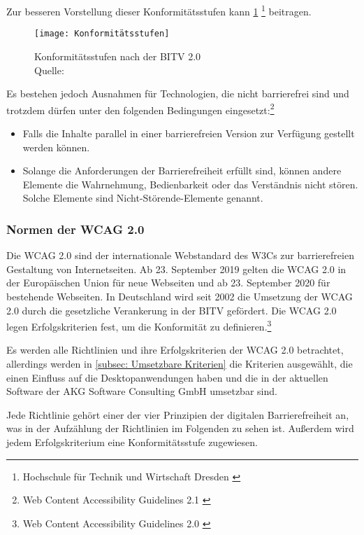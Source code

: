 Zur besseren Vorstellung dieser Konformitätsstufen kann \cref{fig:Konformitätsstufen} \footnote{Hochschule für Technik und Wirtschaft Dresden \cite{HV}} beitragen.

\begin{figure}[H]
	\centering
	\texttt{[image: Konformitätsstufen]}
	\caption[Konformitätsstufen nach der \ac{BITV} 2.0]{Konformitätsstufen nach der \ac{BITV} 2.0 \\Quelle: \cite{HV}}
	\label{fig:Konformitätsstufen}
\end{figure}

\vspace{2cm}

Es bestehen jedoch Ausnahmen für Technologien, die nicht barrierefrei sind und trotzdem dürfen unter den folgenden Bedingungen eingesetzt:\footnote{Web Content Accessibility Guidelines 2.1 \cite{WCAG2.1}}
\begin{itemize}
	\item Falls die Inhalte parallel in einer barrierefreien Version zur Verfügung gestellt werden können.
	\item Solange die Anforderungen der Barrierefreiheit erfüllt sind, können andere Elemente die Wahrnehmung, Bedienbarkeit oder das Verständnis nicht 
	stören. Solche Elemente sind Nicht-Störende-Elemente genannt.
\end{itemize}

\subsubsection{Normen der \ac{WCAG} 2.0}
Die \ac{WCAG} 2.0 sind der internationale Webstandard des \ac{W3C}s zur barrierefreien Gestaltung von Internetseiten. Ab 23. September 2019 gelten die \ac{WCAG} 2.0 in der Europäischen Union für neue Webseiten und ab 23. September 2020 für bestehende Webseiten. In Deutschland wird seit 2002 die Umsetzung der \ac{WCAG} 2.0 durch die gesetzliche Verankerung in der \ac{BITV} gefördert. Die \ac{WCAG} 2.0 legen Erfolgskriterien fest, um die Konformität zu definieren.\footnote{Web Content Accessibility Guidelines 2.0 \cite{WCAG2.0}}

Es werden alle Richtlinien und ihre Erfolgskriterien der \ac{WCAG} 2.0 betrachtet, allerdings werden in \cref{subsec: Umsetzbare Kriterien} die Kriterien ausgewählt, die einen Einfluss 
auf die Desktopanwendungen haben und die in der aktuellen Software der AKG Software Consulting GmbH umsetzbar sind.

Jede Richtlinie gehört einer der vier Prinzipien der digitalen Barrierefreiheit an, was in der Aufzählung der Richtlinien im Folgenden zu sehen ist. Außerdem wird jedem Erfolgskriterium  eine Konformitätsstufe zugewiesen.

